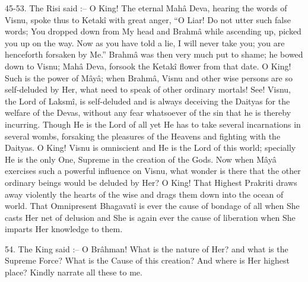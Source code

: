 45-53. The Risi said :-- O King! The eternal Mah\^a Deva, hearing the words of Visnu, spoke thus to Ketak\^i with great anger, ``O Liar! Do not utter such false words; You dropped down from My head and Brahm\^a while ascending up, picked you up on the way. Now as you have told a lie, I will never take you; you are henceforth forsaken by Me.'' Brahm\^a was then very much put to shame; he bowed down to Visnu; Mah\^a Deva, forsook the Ketak\^i flower from that date. O King! Such is the power of M\^ay\^a; when Brahm\^a, Visnu and other wise persons are so self-deluded by Her, what need to speak of other ordinary mortals! See! Visnu, the Lord of Laksm\^i, is self-deluded and is always deceiving the Daityas for the welfare of the Devas, without any fear whatsoever of the sin that he is thereby incurring. Though He is the Lord of all yet He has to take several incarnations in several wombs, forsaking the pleasures of the Heavens and fighting with the Daityas. O King! Visnu is omniscient and He is the Lord of this world; specially He is the only One, Supreme in the creation of the Gods. Now when M\^ay\^a exercises such a powerful influence on Visnu, what wonder is there that the other ordinary beings would be deluded by Her? O King! That Highest Prakriti draws away violently the hearts of the wise and drags them down into the ocean of world. That Omnipresent Bhagavat\^i is ever the cause of bondage of all when She casts Her net of delusion and She is again ever the cause of liberation when She imparts Her knowledge to them.

54. The King said :-- O Br\^ahman! What is the nature of Her? and what is the Supreme Force? What is the Cause of this creation? And where is Her highest place? Kindly narrate all these to me.

